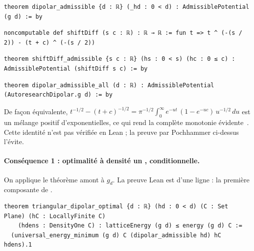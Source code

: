 \begin{leanbox}
\begin{lstlisting}[style=chdeux]
theorem dipolar_admissible {d : ℝ} (_hd : 0 < d) : AdmissiblePotential (g d) := by
\end{lstlisting}
\begin{lstlisting}[style=chdeux]
noncomputable def shiftDiff (s c : ℝ) : ℝ → ℝ := fun t => t ^ (-(s / 2)) - (t + c) ^ (-(s / 2))
\end{lstlisting}
\begin{lstlisting}[style=chdeux]
theorem shiftDiff_admissible {s c : ℝ} (hs : 0 < s) (hc : 0 ≤ c) : AdmissiblePotential (shiftDiff s c) := by
\end{lstlisting}
\begin{lstlisting}[style=chdeux]
theorem dipolar_admissible_all (d : ℝ) : AdmissiblePotential (AutoresearchDipolar.g d) := by
\end{lstlisting}
\end{leanbox}

\begin{remark}
De façon équivalente, $t^{-1/2}-(t+c)^{-1/2}=\pi^{-1/2}\int_0^\infty e^{-ut}\,(1-e^{-uc})\,u^{-1/2}\,du$ est un mélange
positif d'exponentielles, ce qui rend la complète monotonie évidente~\cite{ch2dip}. Cette identité n'est pas vérifiée
en Lean ; la preuve par Pochhammer ci-dessus l'évite.
\end{remark}

\paragraph{Conséquence 1 : optimalité à densité un \tierA, conditionnelle.} On applique le théorème amont à $g_d$.
La preuve Lean est d'une ligne : la première composante de .
\begin{leanbox}
\begin{lstlisting}[style=chdeux]
theorem triangular_dipolar_optimal {d : ℝ} (hd : 0 < d) (C : Set Plane) (hC : LocallyFinite C)
    (hdens : DensityOne C) : latticeEnergy (g d) ≤ energy (g d) C :=
  (universal_energy_minimum (g d) C (dipolar_admissible hd) hC hdens).1
\end{lstlisting}
\end{leanbox}

